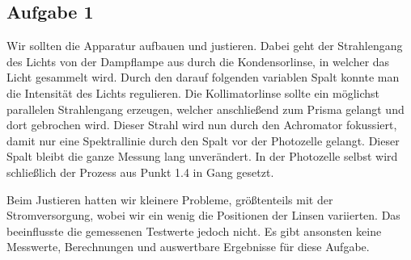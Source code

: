 \subsection{Aufgabe 1}

Wir sollten die Apparatur aufbauen und justieren. Dabei geht der Strahlengang  des Lichts von der Dampflampe aus durch die Kondensorlinse, in welcher das Licht gesammelt wird. Durch den darauf folgenden variablen Spalt konnte man die Intensität des Lichts regulieren. Die Kollimatorlinse sollte ein möglichst parallelen Strahlengang erzeugen, welcher anschließend zum Prisma gelangt und dort gebrochen wird. Dieser Strahl wird nun durch den Achromator fokussiert, damit nur eine Spektrallinie durch den Spalt vor der Photozelle gelangt. Dieser Spalt bleibt die ganze Messung lang unverändert. In der Photozelle selbst wird schließlich der Prozess aus Punkt 1.4 in Gang gesetzt.
\\
\begin{center}
\begin{minipage}{\linewidth}
\centering
{}
%
\label{ringe}
\end{minipage}
\end{center}

Beim Justieren hatten wir kleinere Probleme, größtenteils mit der Stromversorgung, wobei wir ein wenig die Positionen der Linsen variierten. Das beeinflusste die gemessenen Testwerte jedoch nicht. Es gibt ansonsten keine Messwerte, Berechnungen und auswertbare Ergebnisse für diese Aufgabe.

